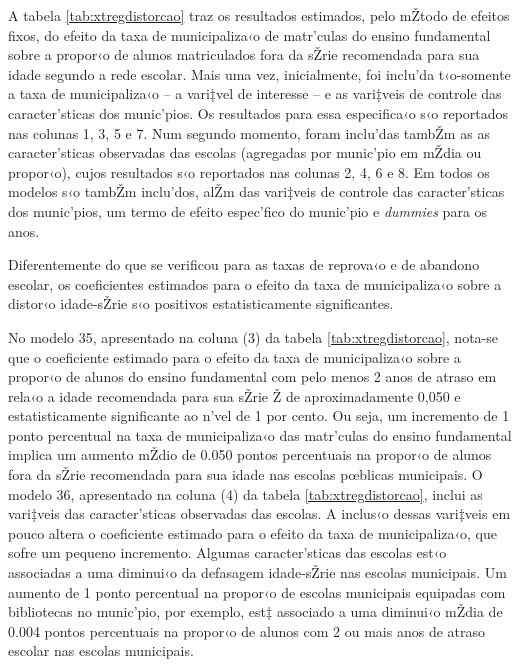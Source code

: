 \documentclass[a4paper, 12pt]{article}
\begin{document}

A tabela \ref{tab:xtregdistorcao} traz os resultados estimados, pelo mŽtodo de efeitos fixos, do efeito da taxa de municipaliza‹o de matr’culas do ensino fundamental sobre a propor‹o de alunos matriculados fora da sŽrie recomendada para sua idade segundo a rede escolar. Mais uma vez, inicialmente, foi inclu’da t‹o-somente a taxa de municipaliza‹o -- a vari‡vel de interesse -- e as vari‡veis de controle das caracter’sticas dos munic’pios. Os resultados para essa especifica‹o s‹o reportados nas colunas 1, 3, 5 e 7. Num segundo momento, foram inclu’das tambŽm as as caracter’sticas observadas das escolas (agregadas por munic’pio em mŽdia ou propor‹o), cujos resultados s‹o reportados nas colunas 2, 4, 6 e 8. Em todos os modelos s‹o tambŽm inclu’dos, alŽm das vari‡veis de controle das caracter’sticas dos munic’pios, um termo de efeito espec’fico do munic’pio e \emph{dummies} para os anos.

Diferentemente do que se verificou para as taxas de reprova‹o e de abandono escolar, os coeficientes estimados para o efeito da taxa de municipaliza‹o sobre a distor‹o idade-sŽrie s‹o positivos estatisticamente significantes. 

No modelo 35, apresentado na coluna (3) da tabela \ref{tab:xtregdistorcao}, nota-se que o coeficiente estimado para o efeito da taxa de municipaliza‹o sobre a propor‹o de alunos do ensino fundamental com pelo menos 2 anos de atraso em rela‹o a idade recomendada para sua sŽrie Ž de aproximadamente 0,050 e estatisticamente significante ao n’vel de 1 por cento. Ou seja, um incremento de 1 ponto percentual na taxa de municipaliza‹o das matr’culas do ensino fundamental implica um aumento mŽdio de 0.050 pontos percentuais na propor‹o de alunos fora da sŽrie recomendada para sua idade nas escolas pœblicas municipais. O modelo 36, apresentado na coluna (4) da tabela \ref{tab:xtregdistorcao}, inclui as vari‡veis das caracter’sticas observadas das escolas. A inclus‹o dessas vari‡veis em pouco altera o coeficiente estimado para o efeito da taxa de municipaliza‹o, que sofre um pequeno incremento. Algumas caracter’sticas das escolas est‹o associadas a uma diminui‹o da defasagem idade-sŽrie nas escolas municipais. Um aumento de 1 ponto percentual na propor‹o de escolas municipais equipadas com bibliotecas no munic’pio, por exemplo, est‡ associado a uma diminui‹o mŽdia de 0.004 pontos percentuais na propor‹o de alunos com 2 ou mais anos de atraso escolar nas escolas municipais.  
\end{document}
